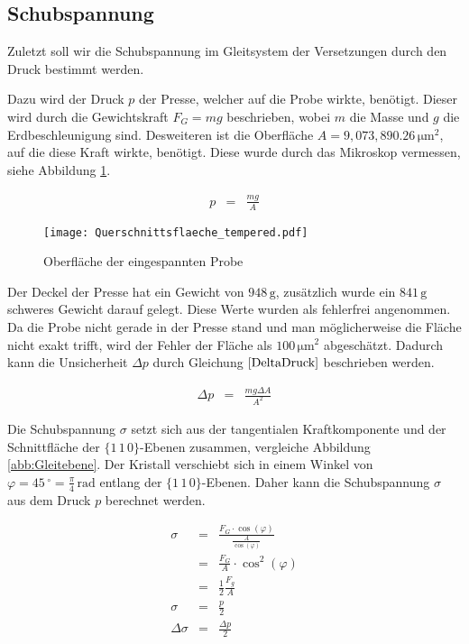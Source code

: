 \documentclass[12pt,a4paper]{scrartcl}
\numberwithin{equation}{section} %
\renewcommand{\[}{} %
\renewcommand{\]}{\noindent} %
\begin{document}
\hypertarget{schubspannung}{%
\subsection{Schubspannung}\label{schubspannung}}

Zuletzt soll wir die Schubspannung im Gleitsystem der Versetzungen durch
den Druck bestimmt werden.

Dazu wird der Druck \(p\) der Presse, welcher auf die Probe wirkte,
benötigt. Dieser wird durch die Gewichtskraft \(F_G=mg\) beschrieben,
wobei \(m\) die Masse und \(g\) die Erdbeschleunigung sind. Desweiteren
ist die Oberfläche \(A=9,073,890.26\mathrm{\,\mu m^2}\), auf die diese
Kraft wirkte, benötigt. Diese wurde durch das Mikroskop vermessen, siehe
Abbildung \ref{abb:Querschnitt}.

\[
\begin{eqnarray}
    p &=& \frac{mg}{A} \label{Druck}
\end{eqnarray}
\]

\begin{figure}[ht]
	\centering
	\texttt{[image: Querschnittsflaeche\_tempered.pdf]}
	\caption{Oberfläche der eingespannten Probe}
	\label{abb:Querschnitt}
\end{figure}

\noindent
Der Deckel der Presse hat ein Gewicht von \(948\mathrm{\,g}\),
zusätzlich wurde ein \(841\mathrm{\,g}\) schweres Gewicht darauf gelegt.
Diese Werte wurden als fehlerfrei angenommen. Da die Probe nicht gerade
in der Presse stand und man möglicherweise die Fläche nicht exakt
trifft, wird der Fehler der Fläche als \(100\mathrm{\,\mu m^2}\)
abgeschätzt. Dadurch kann die Unsicherheit \(\Delta p\) durch Gleichung
\(\eqref{DeltaDruck}\) beschrieben werden.

\[
\begin{eqnarray}
    \Delta p &=& \frac{mg \Delta A}{A^2} \label{DeltaDruck}
\end{eqnarray}
\]

\noindent
Die Schubspannung \(\sigma\) setzt sich aus der tangentialen
Kraftkomponente und der Schnittfläche der
\(\lbrace1\,1\,0\rbrace\)-Ebenen zusammen, vergleiche Abbildung \ref{abb:Gleitebene}. Der Kristall verschiebt
sich in einem Winkel von
\(\varphi=45\,^\circ=\frac{\pi}{4}\mathrm{\,rad}\) entlang der
\(\lbrace1\,1\,0\rbrace\)-Ebenen. Daher kann die Schubspannung
\(\sigma\) aus dem Druck \(p\) berechnet werden.

\[
\begin{eqnarray}
    \sigma &=& \frac{F_G \cdot \cos(\varphi)}{\frac{A}{\cos(\varphi)}}\\
        &=&\frac{F_G}{A} \cdot \cos^2(\varphi) \\
        &=& \frac{1}{2}\frac{F_g}{A}\\
    \sigma &=& \frac{p}{2} \\
    \Delta \sigma &=& \frac{\Delta p}{2}
\end{eqnarray}
\]
\end{document}
